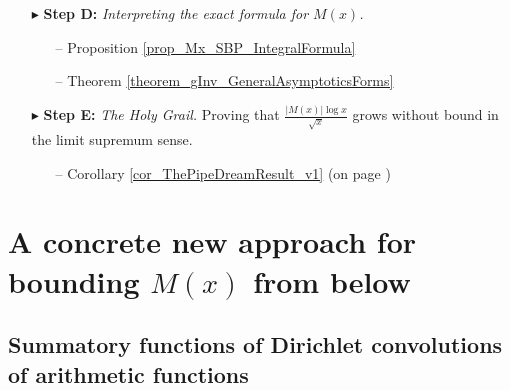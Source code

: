 \documentclass[11pt,reqno,a4letter]{article}
\numberwithin{figure}{section}
\numberwithin{table}{section}
\theoremstyle{plain}
\numberwithin{theorem}{section}
\theoremstyle{definition}
\begin{document}
\begin{itemize}[noitemsep,topsep=0pt,leftmargin=0.95in]
\item[$\blacktriangleright$ \textbf{Step D:}] \textit{Interpreting the exact formula for $M(x)$. } 
     \begin{itemize}[noitemsep,topsep=0pt,leftmargin=0.35in]
     \item[--] \small{Proposition \ref{prop_Mx_SBP_IntegralFormula}} 
     \item[--] \small{Theorem \ref{theorem_gInv_GeneralAsymptoticsForms}} 
     \end{itemize} 
\item[$\blacktriangleright$ \textbf{Step E:}] \textit{The Holy Grail. } 
     Proving that 
     $\frac{|M(x)| \log x}{\sqrt{x}}$ grows without bound in the limit supremum sense. 
     \begin{itemize}[noitemsep,topsep=0pt,leftmargin=0.35in]
     \item[--] \small{Corollary \ref{cor_ThePipeDreamResult_v1} (on page \pageref{proofOf_cor_ThePipeDreamResult_v1})} 
     \end{itemize} 

\end{itemize} 

\newpage 
\section{A concrete new approach for bounding $M(x)$ from below} 

\subsection{Summatory functions of Dirichlet convolutions of arithmetic functions} 
\end{document}

